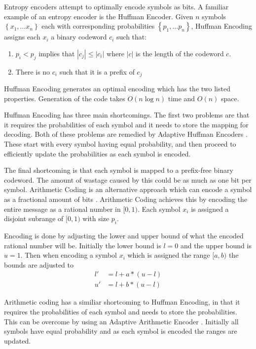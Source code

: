 \documentclass[a4paper]{report}
\begin{document}
Entropy encoders attempt to optimally encode symbols as bits. A familiar
example of an entropy encoder is the Huffman Encoder. Given $n$ symbols
$\left\{x_1, \dots x_n \right\}$ each with corresponding probabilities
$\left\{p_1, \dots p_n \right\}$, Huffman Encoding assigns each $x_i$ a binary
codeword $c_i$ such that: \citep{huffman1952method}
\begin{enumerate}
  \item $p_i < p_j$ implies that $|c_j| \le |c_i|$ where $|c|$ is the length
    of the codeword $c$.
  \item There is no $c_i$ such that it is a prefix of $c_j$
\end{enumerate}

Huffman Encoding generates an optimal encoding which has the two listed
properties. Generation of the code takes $O(n \log n)$ time and $O(n)$ space.

Huffman Encoding has three main shortcomings. The first two problems are that
it requires the probabilities of each symbol and it needs to store the mapping
for decoding. Both of these problems are remedied by Adaptive Huffman Encoders
\citep{drozdek,vitter1987}. These start with every symbol having equal
probability, and then proceed to efficiently update the probabilities as each
symbol is encoded.

The final shortcoming is that each symbol is mapped to a prefix-free binary
codeword. The amount of wastage caused by this could be as much as one bit per
symbol. Arithmetic Coding is an alternative approach which can encode a symbol
as a fractional amount of bits \citep{drozdek}. Arithmetic Coding achieves
this by encoding the entire message as a rational number in $[0,1)$. Each
  symbol $x_i$ is assigned a disjoint subrange of $[0,1)$ with size $p_i$.

Encoding is done by adjusting the lower and upper bound of what the encoded
rational number will be. Initially the lower bound is $l=0$ and the upper
bound is $u=1$. Then when encoding a symbol $x_i$ which is assigned the range
$[a,b)$ the bounds are adjusted to
\begin{align*}
  l' & = l + a * (u-l) \\
  u' & = l + b * (u-l)
\end{align*}

Arithmetic coding has a similiar shortcoming to Huffman Encoding, in that it
requires the probabilities of each symbol and needs to store the
probabilities. This can be overcome by using an Adaptive Arithmetic Encoder
\citep{drozdek}. Initially all symbols have equal probability and as each
symbol is encoded the ranges are updated.
\end{document}

